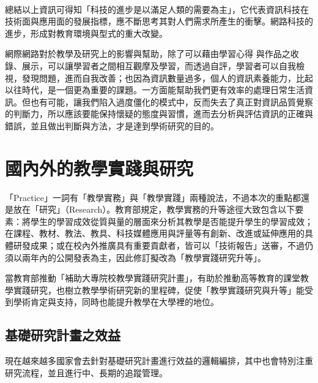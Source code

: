 \\
\par
\renewcommand{\baselinestretch}{1} %
\twelve 總結以上資訊可得知「科技的進步是以滿足人類的需要為主」，它代表資訊科技在技術面與應用面的發展指標，應不斷思考其對人們需求所產生的衝擊。網路科技的進步，形成對教育環境與型式的重大改變。
\par
\renewcommand{\baselinestretch}{1} %
\twelve 網際網路對於教學及研究上的影響與幫助，除了可以藉由學習心得 與作品之收錄、展示，可以讓學習者之間相互觀摩及學習，而透過自評，學習者可以自我檢視，發現問題，進而自我改善；也因為資訊數量過多，個人的資訊素養能力，比起以往時代，是一個更為重要的課題。一方面能幫助我們更有效率的處理日常生活資訊。但也有可能，讓我們陷入過度僵化的模式中，反而失去了真正對資訊品質覺察的判斷力，所以應該要能保持懷疑的態度與習慣，進而去分析與評估資訊的正確與錯誤，並且做出判斷與方法，才是達到學術研究的目的。
\par



\renewcommand{\baselinestretch}{20} %
\section{國內外的教學實踐與研究}
\par
\renewcommand{\baselinestretch}{1} %
\twelve 「Practice」一詞有「教學實務」與「教學實踐」兩種說法，不過本次的重點都還是放在「研究」（Research）。教育部規定，教學實務的升等途徑大致包含以下要素：將學生的學習成效從質與量的層面來分析其教學是否能提升學生的學習成效；在課程、教材、教法、教具、科技媒體應用與評量等有創新、改進或延伸應用的具體研發成果；或在校內外推廣具有重要貢獻者，皆可以「技術報告」送審，不過仍須以兩年內的公開發表為主，因此修訂擬改為「教學實踐研究升等」。
\par

\renewcommand{\baselinestretch}{1} %
\twelve  當教育部推動「補助大專院校教學實踐研究計畫」，有助於推動高等教育的課堂教學實踐研究，也樹立教學學術研究新的里程碑，促使「教學實踐研究與升等」能受到學術肯定與支持，同時也能提升教學在大學裡的地位。
\par

\renewcommand{\baselinestretch}{20} %
\subsection{基礎研究計畫之效益}
\par
\renewcommand{\baselinestretch}{1} %
\twelve 現在越來越多國家會去針對基礎研究計畫進行效益的邏輯編排，其中也會特別注重研究流程，並且進行中、長期的追蹤管理。
\par
\renewcommand{\baselinestretch}{20} %
